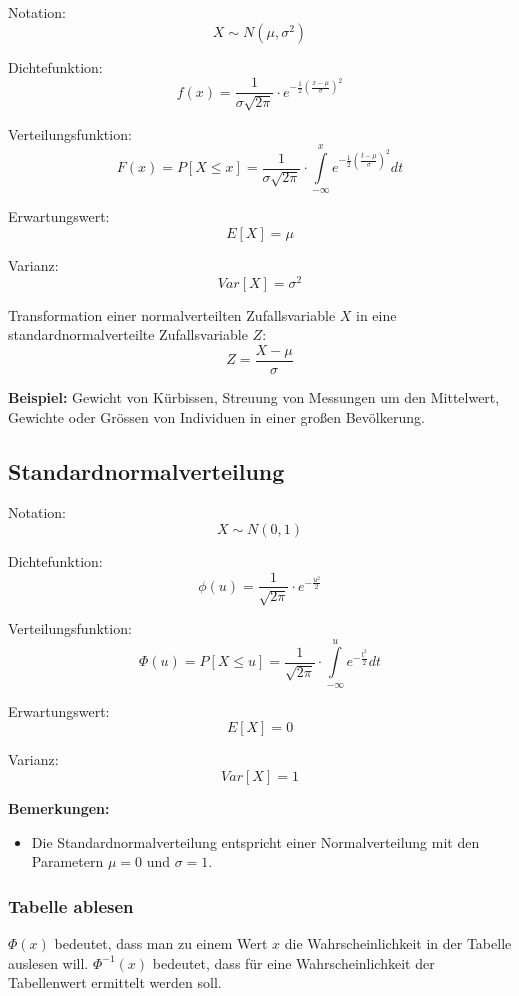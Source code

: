 \documentclass[10pt,a4paper,twocolumn]{article}
\begin{document}
\vspace{10pt}

Notation:
\[
X \sim N(\mu, \sigma^2)
\]

Dichtefunktion:
\[
f(x)=\frac{1}{\sigma \sqrt{2 \pi}}\cdot e^{-\frac{1}{2}\left(\frac{x-\mu}{\sigma}\right)^2}
\]

Verteilungsfunktion:
\[
F(x)=P[X \leq x]=\frac{1}{\sigma \sqrt{2 \pi}}\cdot\int\limits_{-\infty}^x e^{-\frac{1}{2}\left(\frac{t-\mu}{\sigma} \right)^2}dt
\]

Erwartungswert:
\[
E[X]=\mu
\]

Varianz:
\[
Var[X]=\sigma^2
\]

Transformation einer normalverteilten Zufallsvariable $X$ in eine standardnormalverteilte Zufallsvariable $Z$:
\[
Z=\frac{X-\mu}{\sigma}
\]

\textbf{Beispiel:} Gewicht von Kürbissen, Streuung von Messungen um den Mittelwert, Gewichte oder Grössen von Individuen in einer großen Bevölkerung.

\subsection{Standardnormalverteilung}
Notation:
\[
X \sim N(0,1)
\]

Dichtefunktion:
\[
\phi(u)=\frac{1}{\sqrt{2\pi}}\cdot e^{-\frac{u^2}{2}}
\]

Verteilungsfunktion:
\[
\Phi(u)=P[X \leq u]=\frac{1}{\sqrt{2\pi}}\cdot\int \limits_{-\infty}^u e^{-\frac{t^2}{2}}dt
\]

Erwartungswert:
\[
E[X]=0
\]

Varianz:
\[
Var[X]=1
\]

\textbf{Bemerkungen:}
\begin{itemize}
\item Die Standardnormalverteilung entspricht einer Normalverteilung mit den Parametern $\mu = 0$ und $\sigma = 1$.
\end{itemize}

\subsubsection{Tabelle ablesen}
$\Phi(x)$ bedeutet, dass man zu einem Wert $x$ die Wahrscheinlichkeit in der Tabelle auslesen will. $\Phi^{-1}(x)$ bedeutet, dass für eine Wahrscheinlichkeit der Tabellenwert ermittelt werden soll.
\end{document}
